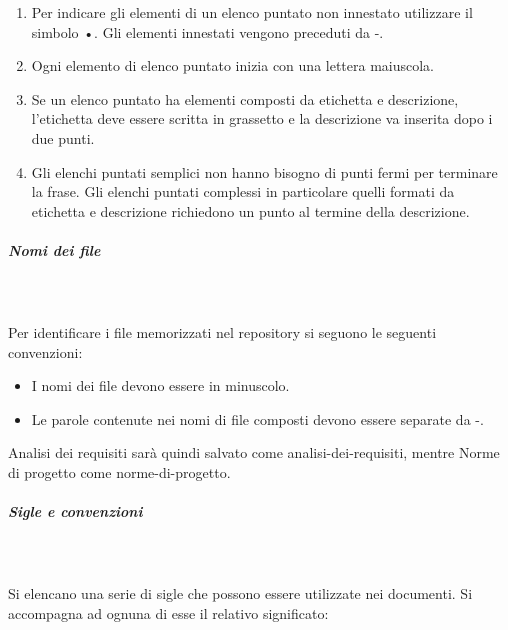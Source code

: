 \documentclass[../norme-di-progetto.tex]{subfiles}
\begin{document}
\begin{enumerate}
  \item Per indicare gli elementi di un elenco puntato non innestato utilizzare il simbolo •. Gli elementi innestati vengono preceduti da -.
  \item Ogni elemento di elenco puntato inizia con una lettera maiuscola.
  \item Se un elenco puntato ha elementi composti da etichetta e descrizione, l'etichetta deve essere scritta in grassetto e la descrizione va inserita dopo i due punti.
  \item Gli elenchi puntati semplici non hanno bisogno di punti fermi per terminare la frase. Gli elenchi puntati complessi in particolare quelli formati da etichetta e descrizione richiedono un punto al termine della descrizione.
\end{enumerate}

\subparagraph{Nomi dei file}\mbox{}\\
\label{nomi dei file}
\\Per identificare i file memorizzati nel repository si seguono le seguenti convenzioni:

\begin{itemize}
  \item I nomi dei file devono essere in minuscolo.
  \item Le parole contenute nei nomi di file composti devono essere separate da -.
\end{itemize}

Analisi dei requisiti sarà quindi salvato come analisi-dei-requisiti, mentre Norme di progetto come norme-di-progetto.

\subparagraph{Sigle e convenzioni}\mbox{}\\
\label{sigle e convenzioni}
\\Si elencano una serie di sigle che possono essere utilizzate nei documenti. Si accompagna ad ognuna di esse il relativo significato:
\end{document}
